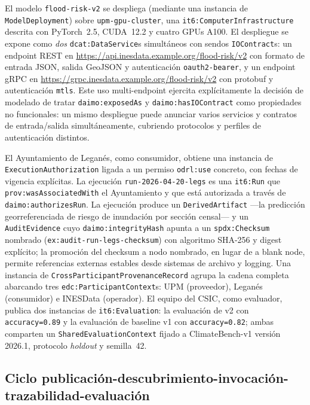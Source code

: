 \documentclass[11pt,a4paper]{article}
\newcommand{\code}[1]{\texttt{#1}}
\begin{document}
El modelo \texttt{flood-risk-v2} se despliega (mediante una instancia de \code{ModelDeployment}) sobre \texttt{upm-gpu-cluster}, una \code{it6:ComputerInfrastructure} descrita con PyTorch~2.5, CUDA~12.2 y cuatro GPUs A100. El despliegue se expone como \emph{dos} \code{dcat:DataService}s simultáneos con sendos \code{IOContract}s: un endpoint REST en \url{https://api.inesdata.example.org/flood-risk/v2} con formato de entrada JSON, salida GeoJSON y autenticación \texttt{oauth2-bearer}, y un endpoint gRPC en \url{https://grpc.inesdata.example.org/flood-risk/v2} con protobuf y autenticación \texttt{mtls}. Este uso multi-endpoint ejercita explícitamente la decisión de modelado de tratar \code{daimo:exposedAs} y \code{daimo:hasIOContract} como propiedades no funcionales: un mismo despliegue puede anunciar varios servicios y contratos de entrada/salida simultáneamente, cubriendo protocolos y perfiles de autenticación distintos.

El Ayuntamiento de Leganés, como consumidor, obtiene una instancia de \code{ExecutionAuthorization} ligada a un permiso \code{odrl:use} concreto, con fechas de vigencia explícitas. La ejecución \texttt{run-2026-04-20-legs} es una \code{it6:Run} que \code{prov:wasAssociatedWith} el Ayuntamiento y que está autorizada a través de \code{daimo:authorizesRun}. La ejecución produce un \code{DerivedArtifact} ---la predicción georreferenciada de riesgo de inundación por sección censal--- y un \code{AuditEvidence} cuyo \code{daimo:integrityHash} apunta a un \code{spdx:Checksum} nombrado (\texttt{ex:audit-run-legs-checksum}) con algoritmo SHA-256 y digest explícito; la promoción del checksum a nodo nombrado, en lugar de a blank node, permite referencias externas estables desde sistemas de archivo y logging. Una instancia de \code{CrossParticipantProvenanceRecord} agrupa la cadena completa abarcando tres \code{edc:ParticipantContext}s: UPM (proveedor), Leganés (consumidor) e INESData (operador). El equipo del CSIC, como evaluador, publica dos instancias de \code{it6:Evaluation}: la evaluación de v2 con \texttt{accuracy=0.89} y la evaluación de baseline v1 con \texttt{accuracy=0.82}; ambas comparten un \code{SharedEvaluationContext} fijado a ClimateBench-v1 versión 2026.1, protocolo \emph{holdout} y semilla~42.

\subsection{Ciclo publicación-descubrimiento-invocación-trazabilidad-evaluación}
\end{document}
